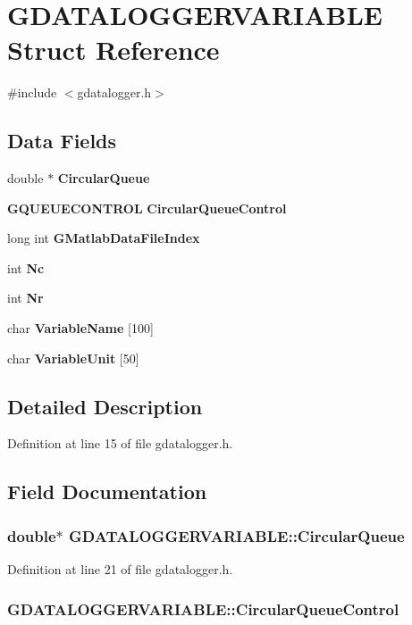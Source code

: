 \section{GDATALOGGERVARIABLE Struct Reference}
\label{structGDATALOGGERVARIABLE}


{\ttfamily \#include $<$gdatalogger.h$>$}\subsection*{Data Fields}
\begin{DoxyCompactItemize}
\item 
double $\ast$ {\bf CircularQueue}
\item 
{\bf GQUEUECONTROL} {\bf CircularQueueControl}
\item 
long int {\bf GMatlabDataFileIndex}
\item 
int {\bf Nc}
\item 
int {\bf Nr}
\item 
char {\bf VariableName} [100]
\item 
char {\bf VariableUnit} [50]
\end{DoxyCompactItemize}


\subsection{Detailed Description}


Definition at line 15 of file gdatalogger.h.

\subsection{Field Documentation}
\subsubsection[{CircularQueue}]{\setlength{\rightskip}{0pt plus 5cm}double$\ast$ {\bf GDATALOGGERVARIABLE::CircularQueue}}\label{structGDATALOGGERVARIABLE_ae17ad02442f31da9518c99ce13607c8b}


Definition at line 21 of file gdatalogger.h.
\subsubsection[{CircularQueueControl}]{ {\bf GDATALOGGERVARIABLE::CircularQueueControl}}\label{structGDATALOGGERVARIABLE_a1a50747d2223f228288b4656470d9bbc}


